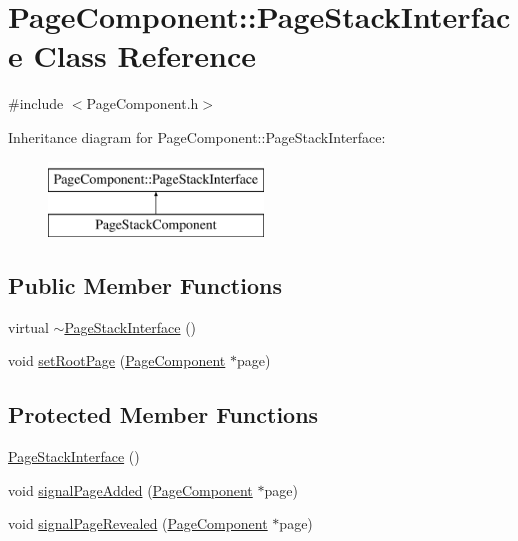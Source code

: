 \hypertarget{classPageComponent_1_1PageStackInterface}{}\section{Page\+Component\+:\+:Page\+Stack\+Interface Class Reference}
\label{classPageComponent_1_1PageStackInterface}


{\ttfamily \#include $<$Page\+Component.\+h$>$}

Inheritance diagram for Page\+Component\+:\+:Page\+Stack\+Interface\+:\begin{figure}[H]
\begin{center}
\leavevmode
\includegraphics[height=2.000000cm]{classPageComponent_1_1PageStackInterface}
\end{center}
\end{figure}
\subsection*{Public Member Functions}
\begin{DoxyCompactItemize}
\item 
virtual \mbox{\hyperlink{classPageComponent_1_1PageStackInterface_ab36c270249e0b3f36f49b10c330bcc48}{$\sim$\+Page\+Stack\+Interface}} ()
\item 
void \mbox{\hyperlink{classPageComponent_1_1PageStackInterface_a3fd5acf64b88393abddc8889af82f8fc}{set\+Root\+Page}} (\mbox{\hyperlink{classPageComponent}{Page\+Component}} $\ast$page)
\end{DoxyCompactItemize}
\subsection*{Protected Member Functions}
\begin{DoxyCompactItemize}
\item 
\mbox{\hyperlink{classPageComponent_1_1PageStackInterface_a106bafd0151eaa2616eb10c17f22e185}{Page\+Stack\+Interface}} ()
\item 
void \mbox{\hyperlink{classPageComponent_1_1PageStackInterface_afa2722ee935d6577b184a948c5a24988}{signal\+Page\+Added}} (\mbox{\hyperlink{classPageComponent}{Page\+Component}} $\ast$page)
\item 
void \mbox{\hyperlink{classPageComponent_1_1PageStackInterface_ac4d38e0118bf43041dd650669415b058}{signal\+Page\+Revealed}} (\mbox{\hyperlink{classPageComponent}{Page\+Component}} $\ast$page)
\end{DoxyCompactItemize}
